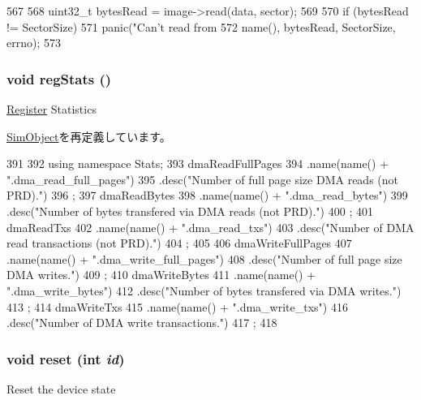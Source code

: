\begin{DoxyCode}
567 {
568     uint32_t bytesRead = image->read(data, sector);
569 
570     if (bytesRead != SectorSize)
571         panic("Can't read from %
572               name(), bytesRead, SectorSize, errno);
573 }
\end{DoxyCode}
\hypertarget{classIdeDisk_a4dc637449366fcdfc4e764cdf12d9b11}{
\subsubsection[{regStats}]{\setlength{\rightskip}{0pt plus 5cm}void regStats ()}}
\label{classIdeDisk_a4dc637449366fcdfc4e764cdf12d9b11}
\hyperlink{classRegister}{Register} Statistics 

\hyperlink{classSimObject_a4dc637449366fcdfc4e764cdf12d9b11}{SimObject}を再定義しています。


\begin{DoxyCode}
391 {
392     using namespace Stats;
393     dmaReadFullPages
394         .name(name() + ".dma_read_full_pages")
395         .desc("Number of full page size DMA reads (not PRD).")
396         ;
397     dmaReadBytes
398         .name(name() + ".dma_read_bytes")
399         .desc("Number of bytes transfered via DMA reads (not PRD).")
400         ;
401     dmaReadTxs
402         .name(name() + ".dma_read_txs")
403         .desc("Number of DMA read transactions (not PRD).")
404         ;
405 
406     dmaWriteFullPages
407         .name(name() + ".dma_write_full_pages")
408         .desc("Number of full page size DMA writes.")
409         ;
410     dmaWriteBytes
411         .name(name() + ".dma_write_bytes")
412         .desc("Number of bytes transfered via DMA writes.")
413         ;
414     dmaWriteTxs
415         .name(name() + ".dma_write_txs")
416         .desc("Number of DMA write transactions.")
417         ;
418 }
\end{DoxyCode}
\hypertarget{classIdeDisk_a28f0332a5e13753c3f831ce1772b50c7}{
\subsubsection[{reset}]{\setlength{\rightskip}{0pt plus 5cm}void reset (int {\em id})}}
\label{classIdeDisk_a28f0332a5e13753c3f831ce1772b50c7}
Reset the device state 


